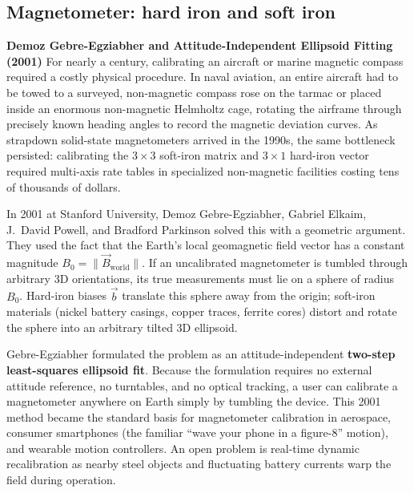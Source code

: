\subsection{Magnetometer: hard iron and soft iron}
\label{ch35:mag-cal}

\begin{historybox}
\textbf{Demoz Gebre-Egziabher and Attitude-Independent Ellipsoid Fitting (2001)}
For nearly a century, calibrating an aircraft or marine magnetic compass required a costly physical procedure. In naval aviation, an entire aircraft had to be towed to a surveyed, non-magnetic compass rose on the tarmac or placed inside an enormous non-magnetic Helmholtz cage, rotating the airframe through precisely known heading angles to record the magnetic deviation curves. As strapdown solid-state magnetometers arrived in the 1990s, the same bottleneck persisted: calibrating the $3\times 3$ soft-iron matrix and $3\times 1$ hard-iron vector required multi-axis rate tables in specialized non-magnetic facilities costing tens of thousands of dollars.

In 2001 at Stanford University, Demoz Gebre-Egziabher, Gabriel Elkaim, J.~David Powell, and Bradford Parkinson solved this with a geometric argument. They used the fact that the Earth's local geomagnetic field vector has a constant magnitude $B_0 = \|\vec{B}_{\text{world}}\|$. If an uncalibrated magnetometer is tumbled through arbitrary 3D orientations, its true measurements must lie on a sphere of radius $B_0$. Hard-iron biases $\vec{b}$ translate this sphere away from the origin; soft-iron materials (nickel battery casings, copper traces, ferrite cores) distort and rotate the sphere into an arbitrary tilted 3D ellipsoid.

Gebre-Egziabher formulated the problem as an attitude-independent \textbf{two-step least-squares ellipsoid fit}. Because the formulation requires no external attitude reference, no turntables, and no optical tracking, a user can calibrate a magnetometer anywhere on Earth simply by tumbling the device. This 2001 method became the standard basis for magnetometer calibration in aerospace, consumer smartphones (the familiar ``wave your phone in a figure-8'' motion), and wearable motion controllers. An open problem is real-time dynamic recalibration as nearby steel objects and fluctuating battery currents warp the field during operation.
\end{historybox}

